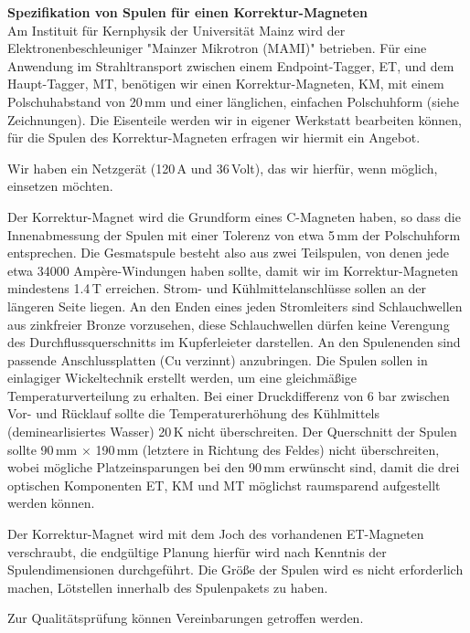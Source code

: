 
{\Large \bf Spezifikation von Spulen f\"ur einen Korrektur-Magneten\\[2ex]}
Am Instituit f\"ur Kernphysik der Universit\"at Mainz wird der
Elektronenbeschleuniger "Mainzer Mikrotron (MAMI)" betrieben.
F\"ur eine Anwendung im Strahltransport zwischen einem Endpoint-Tagger,
ET, und dem
Haupt-Tagger, MT, ben\"otigen wir einen Korrektur-Magneten, KM,
mit einem Pol\-schuh\-ab\-stand von 20\,mm und einer l\"anglichen, einfachen
Polschuhform (siehe Zeichnungen). Die Eisenteile werden wir in 
eigener Werkstatt
bearbeiten k\"onnen, f\"ur die Spulen des Korrektur-Magneten 
erfragen wir hiermit ein Angebot.

Wir haben ein Netzger\"at (120\,A und 36\,Volt), das wir hierf\"ur,
wenn m\"oglich, einsetzen m\"ochten. 

Der Korrektur-Magnet wird die Grundform eines C-Magneten
haben, so dass die Innenabmessung der Spulen mit einer Tolerenz von etwa 
5\,mm der Polschuhform entsprechen. Die Gesmatspule besteht also aus zwei
Teilspulen, von denen jede etwa 34000 Amp\`{e}re-Windungen 
haben sollte, damit
wir im Korrektur-Magneten mindestens 1.4\,T er\-rei\-chen.
Strom- und K\"uhlmittelanschl\"usse sollen an der l\"angeren Seite liegen.
An den Enden eines jeden Stromleiters sind Schlauchwellen aus zinkfreier
Bronze vorzusehen, diese Schlauchwellen d\"urfen keine Verengung des
Durchflussquerschnitts im Kupferleieter darstellen. An den Spulenenden
sind passende Anschlussplatten (Cu verzinnt) anzubringen. Die Spulen sollen
in einlagiger Wickeltechnik erstellt werden, um eine gleichm\"a{\ss}ige
Temperaturverteilung zu erhalten. Bei einer Druckdifferenz von 6 bar
zwischen Vor- und R\"ucklauf sollte die Temperaturerh\"ohung des K\"uhlmittels
(deminearlisiertes Wasser)
20\,K nicht \"uberschreiten. Der Querschnitt der Spulen sollte 
90\,mm $\times$ 190\,mm (letztere in Richtung des Feldes) 
nicht \"uberschreiten,
wobei m\"ogliche Platz\-ein\-spa\-run\-gen bei den 90\,mm 
erw\"unscht sind, damit
die drei optischen Komponenten ET, KM und MT m\"oglichst raumsparend
aufgestellt werden k\"onnen.

Der Korrektur-Magnet wird mit dem Joch des vorhandenen ET-Magneten 
verschraubt, die 
endg\"ultige Planung hierf\"ur wird nach Kenntnis der Spulendimensionen
durchgef\"uhrt. Die Gr\"o{\ss}e der Spulen wird es nicht erforderlich machen,
L\"otstellen innerhalb des Spulenpakets zu haben.

Zur Qualit\"atspr\"ufung k\"onnen Vereinbarungen getroffen werden.


